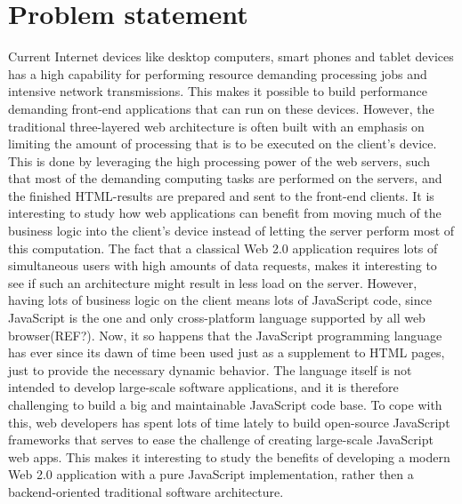 \section {Problem statement}
Current Internet devices like desktop computers, smart phones and tablet devices has a high capability for performing resource demanding processing jobs and intensive network transmissions. This makes it possible to build performance demanding front-end applications that can run on these devices. However, the traditional three-layered web architecture is often built with an emphasis on limiting the amount of processing that is to be executed on the client's device. This is done by leveraging the high processing power of the web servers, such that most of the demanding computing tasks are performed on the servers, and the finished HTML-results are prepared and sent to the front-end clients. It is interesting to study how web applications can benefit from moving much of the business logic into the client's device instead of letting the server perform most of this computation. The fact that a classical Web 2.0 application requires lots of simultaneous users with high amounts of data       requests, makes it interesting to see if such an architecture might result in less load on the server. However, having lots of business logic on the client means lots of JavaScript code, since JavaScript is the one and only cross-platform language supported by all web browser(REF?). Now, it so happens that the JavaScript programming language has ever since its dawn of time been used just as a supplement to HTML pages, just to provide the necessary dynamic behavior. The language itself is not intended to develop large-scale software applications, and it is therefore challenging to build a big and maintainable JavaScript code base. To cope with this, web developers has spent lots of time lately to build open-source JavaScript frameworks that serves to ease the challenge of creating large-scale  JavaScript web apps. This makes it interesting to study the benefits of developing a modern Web 2.0 application with a pure JavaScript implementation, rather then a backend-oriented traditional software architecture.

        
